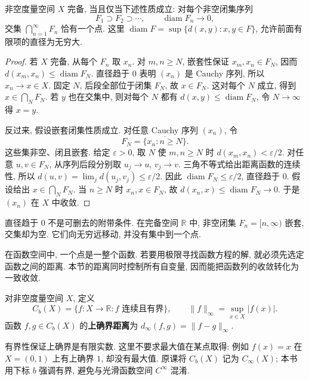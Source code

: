 \begin{theorem}[嵌套闭集判据]\label{thm:complete-nested}
非空度量空间 $X$ 完备, 当且仅当下述性质成立: 对每个非空闭集序列
\[
F_1\supset F_2\supset\cdots,
\qquad \operatorname{diam}F_n\longrightarrow0,
\]
交集 $\bigcap_{n=1}^{\infty}F_n$ 恰有一个点. 这里
$\operatorname{diam}F=\sup\{d(x,y):x,y\in F\}$, 允许前面有限项的直径为无穷大.
\end{theorem}
\begin{proof}
若 $X$ 完备, 从每个 $F_n$ 取 $x_n$. 对 $m,n\geq N$, 嵌套性保证 $x_m,x_n\in F_N$, 因而
$d(x_m,x_n)\leq\operatorname{diam}F_N$. 直径趋于 $0$ 表明 $(x_n)$ 是 Cauchy 序列, 所以 $x_n\to x\in X$. 固定 $N$, 后段全部位于闭集 $F_N$, 故 $x\in F_N$. 这对每个 $N$ 成立, 得到 $x\in\bigcap_NF_N$. 若 $y$ 也在交集中, 则对每个 $N$ 都有 $d(x,y)\leq\operatorname{diam}F_N$, 令 $N\to\infty$ 得 $x=y$.

反过来, 假设嵌套闭集性质成立. 对任意 Cauchy 序列 $(x_n)$, 令
\[
F_N=\overline{\{x_n:n\geq N\}}.
\]
这些集非空、闭且嵌套. 给定 $\varepsilon>0$, 取 $N$ 使 $m,n\geq N$ 时 $d(x_m,x_n)<\varepsilon/2$. 对任意 $u,v\in F_N$, 从序列后段分别取 $u_j\to u$, $v_j\to v$. 三角不等式给出距离函数的连续性, 所以
$d(u,v)=\lim_jd(u_j,v_j)\leq\varepsilon/2$. 因此 $\operatorname{diam}F_N\leq\varepsilon/2$, 直径趋于 $0$. 假设给出 $x\in\bigcap_NF_N$. 当 $n\geq N$ 时 $x_n,x\in F_N$, 故
$d(x_n,x)\leq\operatorname{diam}F_N\to0$. 于是 $(x_n)$ 在 $X$ 中收敛.
\end{proof}

直径趋于 $0$ 不是可删去的附带条件. 在完备空间 $\mathbb R$ 中, 非空闭集 $F_n=[n,\infty)$ 嵌套, 交集却为空. 它们向无穷远移动, 并没有集中到一个点.


在函数空间中, 一个点是一整个函数. 若要用极限寻找函数方程的解, 就必须先选定函数之间的距离. 本节的距离同时控制所有自变量, 因而能把函数列的收敛转化为一致收敛.

\begin{definition}\label{def:cb-space}
对非空度量空间 $X$, 定义
\[
C_b(X)=\{f:X\to\mathbb R:f\text{ 连续且有界}\},
\qquad \|f\|_\infty=\sup_{x\in X}|f(x)|.
\]
函数 $f,g\in C_b(X)$ 的\textbf{上确界距离}为
$d_\infty(f,g)=\|f-g\|_\infty$.
\end{definition}

有界性保证上确界是有限实数. 这里不要求最大值在某点取得: 例如 $f(x)=x$ 在 $X=(0,1)$ 上有上确界 $1$, 却没有最大值. 原课将 $C_b(X)$ 记为 $C_\infty(X)$; 本书用下标 $b$ 强调有界, 避免与光滑函数空间 $C^\infty$ 混淆.

